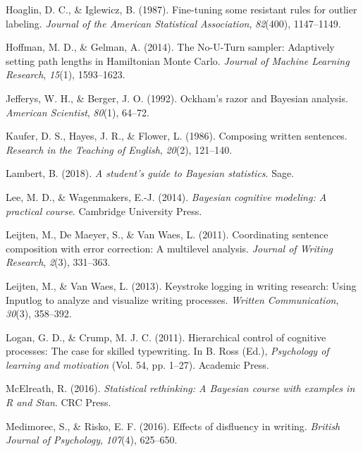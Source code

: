 \documentclass[
  english,
  man,mask,floatsintext]{apa7}
\newlength{\cslhangindent}
\newenvironment{cslreferences}%
  {\setlength{\parindent}{0pt}%
  \everypar{\setlength{\hangindent}{\cslhangindent}}\ignorespaces}%
  {\par}
\begin{document}
\begin{cslreferences}
\leavevmode\hypertarget{ref-hoaglin1987fine}{}%
Hoaglin, D. C., \& Iglewicz, B. (1987). Fine-tuning some resistant rules for outlier labeling. \emph{Journal of the American Statistical Association}, \emph{82}(400), 1147--1149.

\leavevmode\hypertarget{ref-hoffman2014no}{}%
Hoffman, M. D., \& Gelman, A. (2014). The No-U-Turn sampler: Adaptively setting path lengths in Hamiltonian Monte Carlo. \emph{Journal of Machine Learning Research}, \emph{15}(1), 1593--1623.

\leavevmode\hypertarget{ref-jefferys1992ockham}{}%
Jefferys, W. H., \& Berger, J. O. (1992). Ockham's razor and Bayesian analysis. \emph{American Scientist}, \emph{80}(1), 64--72.

\leavevmode\hypertarget{ref-kaufer1986composing}{}%
Kaufer, D. S., Hayes, J. R., \& Flower, L. (1986). Composing written sentences. \emph{Research in the Teaching of English}, \emph{20}(2), 121--140.

\leavevmode\hypertarget{ref-lambert2018student}{}%
Lambert, B. (2018). \emph{A student's guide to Bayesian statistics}. Sage.

\leavevmode\hypertarget{ref-lee2014bayesian}{}%
Lee, M. D., \& Wagenmakers, E.-J. (2014). \emph{Bayesian cognitive modeling: A practical course}. Cambridge University Press.

\leavevmode\hypertarget{ref-leijten2011coordinating}{}%
Leijten, M., De Maeyer, S., \& Van Waes, L. (2011). Coordinating sentence composition with error correction: A multilevel analysis. \emph{Journal of Writing Research}, \emph{2}(3), 331--363.

\leavevmode\hypertarget{ref-leijten2013keystroke}{}%
Leijten, M., \& Van Waes, L. (2013). Keystroke logging in writing research: Using Inputlog to analyze and visualize writing processes. \emph{Written Communication}, \emph{30}(3), 358--392.

\leavevmode\hypertarget{ref-logan2011hierarchical}{}%
Logan, G. D., \& Crump, M. J. C. (2011). Hierarchical control of cognitive processes: The case for skilled typewriting. In B. Ross (Ed.), \emph{Psychology of learning and motivation} (Vol. 54, pp. 1--27). Academic Press.

\leavevmode\hypertarget{ref-mcelreath2016statistical}{}%
McElreath, R. (2016). \emph{Statistical rethinking: A Bayesian course with examples in R and Stan}. CRC Press.

\leavevmode\hypertarget{ref-medimorec2016effects}{}%
Medimorec, S., \& Risko, E. F. (2016). Effects of disfluency in writing. \emph{British Journal of Psychology}, \emph{107}(4), 625--650.


\end{cslreferences}
\end{document}
